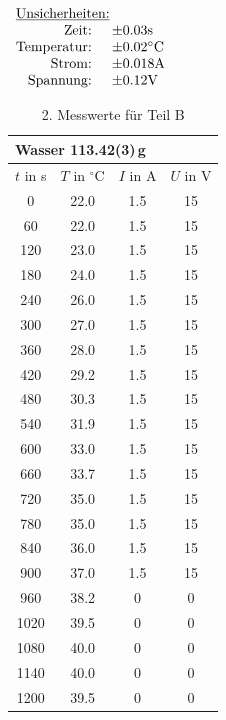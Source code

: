 \documentclass[11pt,a4paper]{article}
\begin{document}
\begin{table}[h]
\centering
$\begin{array}{rl}
\multicolumn{2}{l}{\textrm{\underline{Unsicherheiten:}}}\\
\textrm{Zeit: } & \pm 0.03 \textrm{s}\\
\textrm{Temperatur: } & \pm 0.02 \textrm{\celsius}\\
\textrm{Strom: } & \pm 0.018 \textrm{A}\\
\textrm{Spannung: } & \pm 0.12 \textrm{V}
\end{array}$
\begin{tabular}{|c|c|c|c|}
\multicolumn{4}{l}{Wasser 113.42(3)\,g}\\
\hline
$t$ in s & $T$ in $^\circ\textrm{C}$ & $I$ in A & $U$ in V \\
\hline 
0   & 22.0 & 1.5 & 15\\
60  & 22.0 & 1.5 & 15\\
120 & 23.0 & 1.5 & 15\\
180 & 24.0 & 1.5 & 15\\
240 & 26.0 & 1.5 & 15\\ 
300 & 27.0 & 1.5 & 15\\ 
360 & 28.0 & 1.5 & 15\\ 
420 & 29.2 & 1.5 & 15\\ 
480 & 30.3 & 1.5 & 15\\ 
540 & 31.9 & 1.5 & 15\\ 
600 & 33.0 & 1.5 & 15\\ 
660 & 33.7 & 1.5 & 15\\ 
720 & 35.0 & 1.5 & 15\\ 
780 & 35.0 & 1.5 & 15\\ 
840 & 36.0 & 1.5 & 15\\
900 & 37.0 & 1.5 & 15\\
960 & 38.2 &   0 &  0\\
1020 & 39.5 &  0 &  0\\
1080 & 40.0 &  0 &  0\\
1140 & 40.0 &  0 &  0\\
1200 & 39.5 &  0 &  0\\
\hline
\end{tabular}
\renewcommand\thetable{T5}
\caption{2. Messwerte für Teil B}
\label{tab:B2}
\end{table}

\pagebreak

\pagebreak
\phantom{lol}
\end{document}
